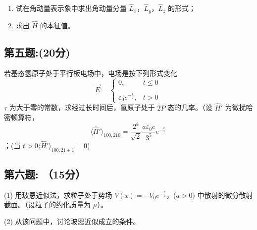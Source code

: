 \begin{enumerate}
    \item 试在角动量表示象中求出角动量分量 $\hat{L}_x$，$\hat{L}_y$，$\hat{L}_z$ 的形式；
    \item 求出 $\hat{H}$ 的本征值。
\end{enumerate}
\subsection{第五题:(20分)}
若基态氢原子处于平行板电场中，电场是按下列形式变化
$$\vec{E} = \begin{cases} 0, & t \leq 0 \\\\\varepsilon_0 e^{-\frac{t}{\tau}}, & t > 0\end{cases}~$$
$\tau$ 为大于零的常数，求经过长时间后，氢原子处于 $2P$ 态的几率。（设 $\hat{H}'$ 为微扰哈密顿算符，
$$\langle \hat{H}' \rangle_{100,210} = \frac{2^8}{\sqrt{2}} \frac{a\varepsilon_0 e}{3^5} e^{-\frac{t}{\tau}}~$$；(当  $t > 0 \langle \hat{H}' \rangle_{100,21\pm 1} = 0 $)
\subsection{第六题: （15分）}
(1) 用玻恩近似法，求粒子处于势场 $V(x) = -V_0 e^{-\frac{r}{a}}$，($a > 0$) 中散射的微分散射截面。（设粒子的约化质量为 $\mu$）。

(2) 从该问题中，讨论玻恩近似成立的条件。